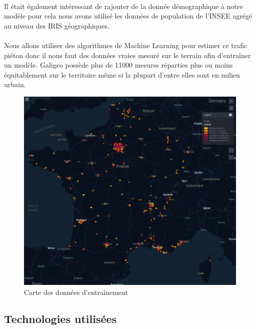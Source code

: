 \paragraph*{}

Il était également intéressant de rajouter de la donnée démographique à notre modèle pour cela nous avons utilisé les données de population de l'INSEE agrégé au niveau des IRIS géographiques.

\paragraph*{}

Nous allons utiliser des algorithmes de Machine Learning pour estimer ce trafic piéton donc il nous faut des données vraies mesuré sur le terrain afin d'entraîner un modèle. Galigeo possède plus de 11000 mesures réparties plus ou moins équitablement sur le territoire même si la plupart d'entre elles sont en milieu urbain.

\begin{figure}[H]
    \centering
    \includegraphics[width=\linewidth]{images/graphs/map_of_label_footfall.png}
    \caption{Carte des données d'entraînement}
    \label{fig:footfallmap}
\end{figure}

\subsection{Technologies utilisées}


